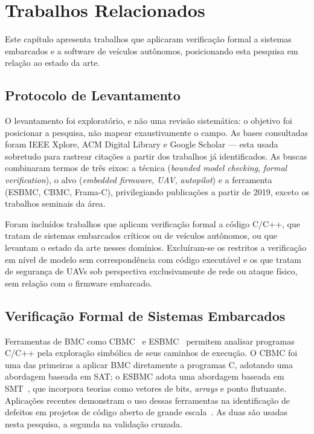 \chapter{Trabalhos Relacionados}
\label{cap:relacionados}

Este capítulo apresenta trabalhos que aplicaram verificação formal a sistemas
embarcados e a software de veículos autônomos, posicionando esta pesquisa em
relação ao estado da arte.

\section{Protocolo de Levantamento}
\label{sec:rel-protocolo}

O levantamento foi exploratório, e não uma revisão sistemática: o objetivo foi
posicionar a pesquisa, não mapear exaustivamente o campo. As bases consultadas
foram IEEE Xplore, ACM Digital Library e Google Scholar --- esta usada sobretudo
para rastrear citações a partir dos trabalhos já identificados. As buscas
combinaram termos de três eixos: a técnica (\textit{bounded model checking},
\textit{formal verification}), o alvo (\textit{embedded firmware}, \textit{UAV},
\textit{autopilot}) e a ferramenta (ESBMC, CBMC, Frama-C), privilegiando
publicações a partir de 2019, exceto os trabalhos seminais da área.

Foram incluídos trabalhos que aplicam verificação formal a código C/C++, que
tratam de sistemas embarcados críticos ou de veículos autônomos, ou que levantam
o estado da arte nesses domínios. Excluíram-se os restritos a verificação em
nível de modelo sem correspondência com código executável e os que tratam de
segurança de UAVs sob perspectiva exclusivamente de rede ou ataque físico, sem
relação com o firmware embarcado.

\section{Verificação Formal de Sistemas Embarcados}
\label{sec:rel-embarcados}

Ferramentas de BMC como CBMC~\cite{Kroening2014} e ESBMC~\cite{Menezes2024}
permitem analisar programas C/C++ pela exploração simbólica de seus caminhos de
execução. O CBMC foi uma das primeiras a aplicar BMC diretamente a programas C,
adotando uma abordagem baseada em SAT; o ESBMC adota uma abordagem baseada em
SMT~\cite{deMoura2008}, que incorpora teorias como vetores de bits,
\textit{arrays} e ponto flutuante. Aplicações recentes demonstram o uso dessas
ferramentas na identificação de defeitos em projetos de código aberto de grande
escala~\cite{Sousa2026}. As duas são usadas nesta pesquisa, a segunda na
validação cruzada.

